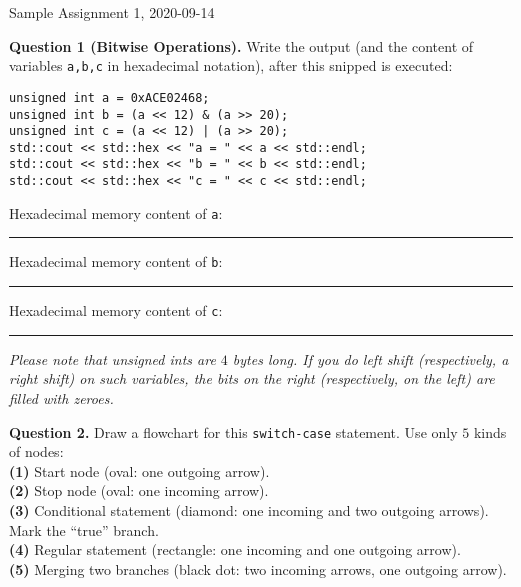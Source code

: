 \documentclass[11pt]{article}
\begin{document}
\thispagestyle{empty}



\begin{center}
{\Large Sample Assignment 1, 2020-09-14}
\end{center}


{\bf Question 1 (Bitwise Operations).} Write the output
(and the content of variables {\tt a,b,c} in hexadecimal notation),
after this snipped is executed:
\begin{Verbatim}[frame=single]
unsigned int a = 0xACE02468;
unsigned int b = (a << 12) & (a >> 20);
unsigned int c = (a << 12) | (a >> 20);
std::cout << std::hex << "a = " << a << std::endl;
std::cout << std::hex << "b = " << b << std::endl;
std::cout << std::hex << "c = " << c << std::endl;
\end{Verbatim}


\vspace{10pt}
Hexadecimal memory content of {\tt a}: \rule{4cm}{0.4pt} 

\vspace{10pt}
Hexadecimal memory content of {\tt b}: \rule{4cm}{0.4pt} 

\vspace{10pt}
Hexadecimal memory content of {\tt c}: \rule{4cm}{0.4pt} 

{\em Please note that unsigned ints are $4$ bytes long. If you do left shift (respectively, a right shift) on 
such variables, the bits on the right (respectively, on the left) are filled with zeroes.}









\vspace{10pt}
{\bf Question 2.} 
Draw a flowchart for this {\tt switch-case} statement. Use only $5$ kinds of nodes:\\
{\footnotesize
{\bf (1)} Start node (oval: one outgoing arrow).\\
{\bf (2)} Stop node (oval: one incoming arrow).\\
{\bf (3)} Conditional statement (diamond: one incoming and two outgoing arrows). Mark the ``true'' branch.\\
{\bf (4)} Regular statement (rectangle: one incoming and one outgoing arrow).\\
{\bf (5)} Merging two branches (black dot: two incoming arrows, one outgoing arrow).
}
\end{document}
